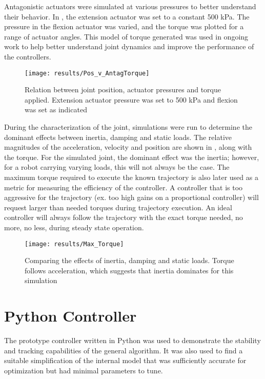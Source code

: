 
Antagonistic actuators were simulated at various pressures to better understand
their behavior. In , the extension
actuator was set to a constant 500 kPa. The pressure in the flexion actuator was
varied, and the torque was plotted for a range of actuator angles. This model of
torque generated was used in ongoing work to help better understand joint
dynamics and improve the performance of the controllers.

\begin{figure}
\centering
\texttt{[image: results/Pos\_v\_AntagTorque]}
\caption{Relation between joint position, actuator pressures and
torque applied. Extension actuator pressure was set to 500 kPa and flexion was
set as indicated}
\label{fig:AntagonisticPressureTorque}
\end{figure}

During the characterization of the joint, simulations were run to determine the
dominant effects between inertia, damping and static loads. The relative 
magnitudes of the acceleration, velocity and position are shown in 
, along with the
torque. For the simulated joint, the dominant effect was the inertia; however,
for a robot carrying varying loads, this will not always be the case. The 
maximum torque required to execute the known trajectory is also later used as a
metric for measuring the efficiency of the controller. A controller that is too
aggressive for the trajectory (ex. too high gains on a proportional controller)
will request larger than needed torques during trajectory execution. An ideal
controller will always follow the trajectory with the exact torque needed, no 
more, no less, during steady state operation.

\begin{figure}
\centering
\texttt{[image: results/Max\_Torque]}
\caption{Comparing the effects of inertia, damping and static loads. Torque follows acceleration, which suggests that inertia dominates for this simulation}
\label{fig:MaxTorque}
\end{figure}

\section{Python Controller}

The prototype controller written in Python was used to demonstrate the stability
and tracking capabilities of the general algorithm. It was also used to find a
suitable simplification of the internal model that was sufficiently accurate for
optimization but had minimal parameters to tune.

